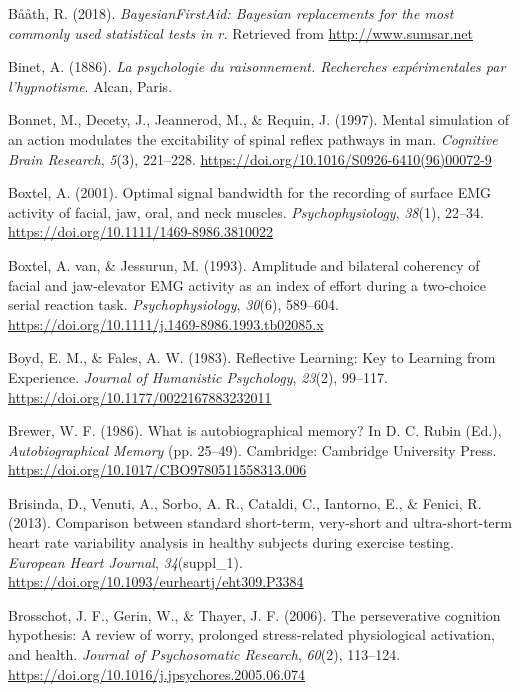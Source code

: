 \documentclass[a4paper,12pt,twoside,openright,oldfontcommands]{memoir}
\begin{document}
\leavevmode\hypertarget{ref-R-BayesianFirstAid}{}%
Bååth, R. (2018). \emph{BayesianFirstAid: Bayesian replacements for the most commonly used statistical tests in r.} Retrieved from \url{http://www.sumsar.net}

\leavevmode\hypertarget{ref-binet_psychologie_1886}{}%
Binet, A. (1886). \emph{La psychologie du raisonnement. Recherches expérimentales par l'hypnotisme}. Alcan, Paris.

\leavevmode\hypertarget{ref-bonnet_mental_1997}{}%
Bonnet, M., Decety, J., Jeannerod, M., \& Requin, J. (1997). Mental simulation of an action modulates the excitability of spinal reflex pathways in man. \emph{Cognitive Brain Research}, \emph{5}(3), 221--228. \url{https://doi.org/10.1016/S0926-6410(96)00072-9}

\leavevmode\hypertarget{ref-boxtel_optimal_2001}{}%
Boxtel, A. (2001). Optimal signal bandwidth for the recording of surface EMG activity of facial, jaw, oral, and neck muscles. \emph{Psychophysiology}, \emph{38}(1), 22--34. \url{https://doi.org/10.1111/1469-8986.3810022}

\leavevmode\hypertarget{ref-van_boxtel_amplitude_1993}{}%
Boxtel, A. van, \& Jessurun, M. (1993). Amplitude and bilateral coherency of facial and jaw-elevator EMG activity as an index of effort during a two-choice serial reaction task. \emph{Psychophysiology}, \emph{30}(6), 589--604. \url{https://doi.org/10.1111/j.1469-8986.1993.tb02085.x}

\leavevmode\hypertarget{ref-boyd_reflective_1983}{}%
Boyd, E. M., \& Fales, A. W. (1983). Reflective Learning: Key to Learning from Experience. \emph{Journal of Humanistic Psychology}, \emph{23}(2), 99--117. \url{https://doi.org/10.1177/0022167883232011}

\leavevmode\hypertarget{ref-rubin_what_1986}{}%
Brewer, W. F. (1986). What is autobiographical memory? In D. C. Rubin (Ed.), \emph{Autobiographical Memory} (pp. 25--49). Cambridge: Cambridge University Press. \url{https://doi.org/10.1017/CBO9780511558313.006}

\leavevmode\hypertarget{ref-brisinda_comparison_2013}{}%
Brisinda, D., Venuti, A., Sorbo, A. R., Cataldi, C., Iantorno, E., \& Fenici, R. (2013). Comparison between standard short-term, very-short and ultra-short-term heart rate variability analysis in healthy subjects during exercise testing. \emph{European Heart Journal}, \emph{34}(suppl\_1). \url{https://doi.org/10.1093/eurheartj/eht309.P3384}

\leavevmode\hypertarget{ref-Brosschot2006}{}%
Brosschot, J. F., Gerin, W., \& Thayer, J. F. (2006). The perseverative cognition hypothesis: A review of worry, prolonged stress-related physiological activation, and health. \emph{Journal of Psychosomatic Research}, \emph{60}(2), 113--124. \url{https://doi.org/10.1016/j.jpsychores.2005.06.074}
\end{document}
